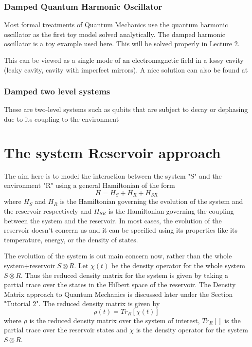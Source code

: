 \documentclass{scrartcl}
\begin{document}
\subsubsection{Damped Quantum Harmonic Oscillator}
Most formal treatments of Quantum Mechanics use the quantum harmonic oscillator as the first toy model solved analytically. The damped harmonic oscillator is a toy example used here. This will be solved properly in Lecture 2. 

This can be viewed as a single mode of an electromagnetic field in a lossy cavity (leaky cavity, cavity with imperfect mirrors). A nice solution can also be found at
\subsubsection{Damped two level systems}
These are two-level systems such as qubits that are subject to decay or dephasing due to its coupling to the environment
\section{The system Reservoir approach}
The aim here is to model the interaction between the system "S" and the environment "R" using a general Hamiltonian of the form
\begin{equation}
    H = H_S + H_R + H_{SR}
\end{equation}
where $H_S$ and $H_R$ is the Hamiltonian governing the evolution of the system and the reservoir respectively and $H_{SR}$ is the Hamiltonian governing the coupling between the system and the reservoir. In most cases, the evolution of the reservoir doesn't concern us and it can be specified using its properties like its temperature, energy, or the density of states. 

The evolution of the system is out main concern now, rather than the whole system+reservoir $S \otimes R$. Let $\chi (t)$ be the density operator for the whole system $S\otimes R$. Thus the reduced density matrix for the system is given by taking a partial trace over the states in the Hilbert space of the reservoir. The Density Matrix approach to Quantum Mechanics is discussed later under the Section "Tutorial 2". The reduced density matrix is given by 
\begin{equation}
    \rho (t) = Tr_R[\chi (t)]
\end{equation}
where $\rho$ is the reduced density matrix over the system of interest, $Tr_R[]$ is the partial trace over the reservoir states and $\chi$ is the density operator for the system $S\otimes R$.
\end{document}
